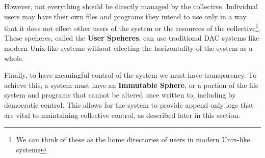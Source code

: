 However, not everything should be directly managed by the collective. Individual
users may have their own files and programs they intend to use only in a way
that it does not effect other users of the system or the resources of the
collective\footnote{We can think of these as the home directories of users in
modern Unix-like systems}. These speheres, called the \textbf{User Speheres},
can use traditional DAC systems like modern Unix-like systems without effecting
the horizontality of the system as a whole.

Finally, to have meaningful control of the system we must have transparency. To
achieve this, a system must have an \textbf{Immutable Sphere}, or a portion of
the file system and programs that cannot be altered once written to, including
by democratic control. This allows for the system to provide append only logs
that are vital to maintaining collective control, as described later in this
section.

